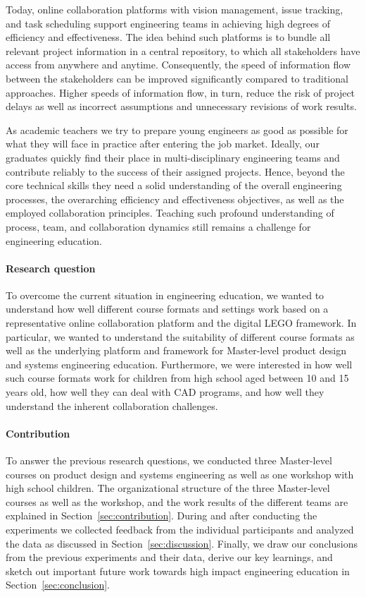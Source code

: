 \documentclass{PDS}
\begin{document}
Today, online collaboration platforms with vision management, issue tracking, and task scheduling support engineering teams in achieving high degrees of efficiency and effectiveness.
The idea behind such platforms is to bundle all relevant project information in a central repository, to which all stakeholders have access from anywhere and anytime.
Consequently, the speed of information flow between the stakeholders can be improved significantly compared to traditional approaches.
Higher speeds of information flow, in turn, reduce the risk of project delays as well as incorrect assumptions and unnecessary revisions of work results.

As academic teachers we try to prepare young engineers as good as possible for what they will face in practice after entering the job market.
Ideally, our graduates quickly find their place in multi-disciplinary engineering teams and contribute reliably to the success of their assigned projects.
Hence, beyond the core technical skills they need a solid understanding of the overall engineering processes, the overarching efficiency and effectiveness objectives, as well as the employed collaboration principles.
Teaching such profound understanding of process, team, and collaboration dynamics still remains a challenge for engineering education.

\paragraph{Research question}

To overcome the current situation in engineering education, we wanted to understand how well different course formats and settings work based on a representative online collaboration platform and the digital LEGO framework.
In particular, we wanted to understand the suitability of different course formats as well as the underlying platform and framework for Master-level product design and systems engineering education.
Furthermore, we were interested in how well such course formats work for children from high school aged between 10 and 15 years old, how well they can deal with CAD programs, and how well they understand the inherent collaboration challenges.

\paragraph{Contribution}

To answer the previous research questions, we conducted three Master-level courses on product design and systems engineering as well as one workshop with high school children.
The organizational structure of the three Master-level courses as well as the workshop, and the work results of the different teams are explained in Section~\ref{sec:contribution}.
During and after conducting the experiments we collected feedback from the individual participants and analyzed the data as discussed in Section~\ref{sec:discussion}.
Finally, we draw our conclusions from the previous experiments and their data, derive our key learnings, and sketch out important future work towards high impact engineering education in Section~\ref{sec:conclusion}.
\end{document}
